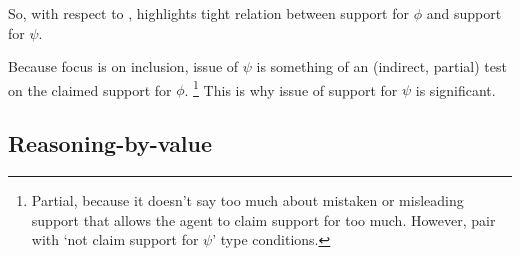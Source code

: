 \begin{note}
  So, with respect to \nI{}, \incl{} highlights tight relation between support for \(\phi\) and support for \(\psi\).

  Because focus is on inclusion, issue of \(\psi\) is something of an (indirect, partial) test on the claimed support for \(\phi\).\nolinebreak
  \footnote{
    Partial, because it doesn't say too much about mistaken or misleading support that allows the agent to claim support for too much.
    However, pair with `not claim support for \(\psi\)' type conditions.
  }
  This is why issue of support for \(\psi\) is significant.
\end{note}


\subsection{Reasoning-by-value}
\label{sec:reasoning-value}

